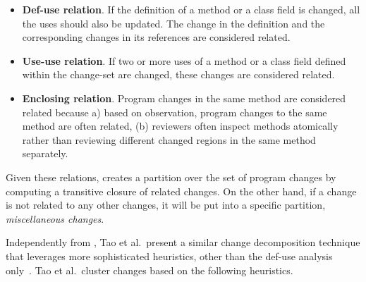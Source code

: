 \documentclass[11pt]{article}
\begin{document}
\begin{itemize}
 \item {\bf Def-use relation}. If the definition of a method or a class field is changed, all the uses should also be updated. The change in the definition and the corresponding changes in its references are considered related.
 \item {\bf Use-use relation}. If two or more uses of a method or a class field defined within the change-set are changed, these changes are considered related. 
 \item {\bf Enclosing relation}. Program changes in the same method are considered related because a) based on observation, program changes to the same method are often related, (b) reviewers often inspect methods atomically rather than reviewing different changed regions in the same method separately.
\end{itemize}

Given these relations, {\clusterchanges} creates a partition over the set of program changes by computing a transitive closure of related changes. On the other hand, if a change is not related to any other changes, it will be put into a specific partition, {\em miscellaneous changes}.

Independently from {\clusterchanges}, Tao et al.~present a similar change decomposition technique that leverages more sophisticated heuristics, other than the def-use analysis only~\cite{tao2015partitioning}. Tao et al.~cluster changes based on the following heuristics.
\end{document}
